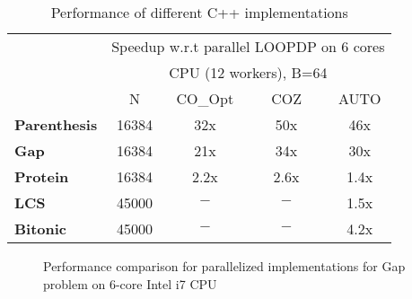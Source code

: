 \begin{table}
\centering
\begin{tabular}{|l|c|c|c|c|}
    \cline{2-5}
  \multicolumn{1}{c|}{} & \multicolumn{4}{c|}{\scriptsize Speedup w.r.t parallel LOOPDP on 6 cores}  \\
  \multicolumn{1}{c|}{} & \multicolumn{4}{c|}{\scriptsize   CPU (12 workers), B=64}  \\
  \multicolumn{1}{c|}{} & \multicolumn{1}{c|}{~~N~~} & \multicolumn{1}{c|}{CO\_Opt} & \multicolumn{1}{c|}{~~COZ~~} & \multicolumn{1}{c|}{AUTO}  \\
  \hline
  {\bf Parenthesis}  & 16384  & 32x & 50x & 46x\\
  \hline
  {\bf Gap}  & 16384 & 21x & 34x & 30x\\
  \hline
  {\bf Protein} & 16384  & 2.2x & 2.6x & 1.4x \\
  \hline
  {\bf LCS}  & 45000 & $-$ & $-$ & 1.5x \\
  \hline
  {\bf Bitonic}  & 45000  & $-$ & $-$ & 4.2x\\
  \hline
\end{tabular}
\caption{\label{evaluation:cppruntimes}
  Performance of different C++ implementations}
\end{table}

\begin{figure}
\resizebox{8cm}{!}{
}
\caption{\label{fig:gap} Performance comparison for parallelized implementations for Gap problem on 6-core Intel i7 CPU}
\end{figure}